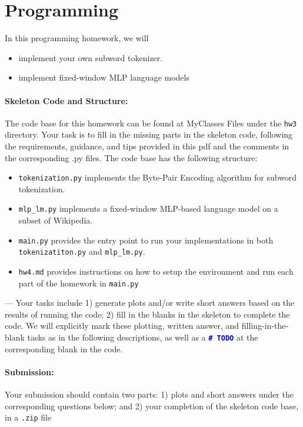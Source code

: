 \clearpage
\section{Programming}
In this programming homework, we will
\begin{itemize}
    \item implement your own subword tokenizer.
    \item implement fixed-window MLP language models
\end{itemize}

\noindent \paragraph{Skeleton Code and Structure:}
The code base for this homework can be found at MyClasses Files under the \texttt{hw3} directory. Your task is to fill in the missing parts in the skeleton code, following the requirements, guidance, and tips provided in this pdf and the comments in the corresponding .py files.
The code base has the following structure:
\begin{itemize}
    \item \texttt{tokenization.py} implements the Byte-Pair Encoding algorithm for subword tokenization.
    \item \texttt{mlp\_lm.py} implements a fixed-window MLP-based language model on a subset of Wikipedia. 
    \item \texttt{main.py} provides the entry point to run your implementations in both \texttt{tokenizatiton.py} and \texttt{mlp\_lm.py}.
    \item \texttt{hw4.md} provides instructions on how to setup the environment and run each part of the homework in \texttt{main.py}
    
\end{itemize}

\noindent \todo{} ---
Your tasks include
1) generate plots and/or write short answers based on the results of running the code; 2) fill in the blanks in the skeleton to complete the code. We will explicitly mark these plotting, written answer, and filling-in-the-blank tasks as \todo{} in the following descriptions, as well as a \textcolor{blue}{\texttt{\textbf{\#~TODO}}} at the corresponding blank in the code. \\
\noindent \paragraph{Submission:} Your submission should contain two parts: 1) plots and short answers under the corresponding questions below; and 2) your completion of the skeleton code base, in a \texttt{.zip} file

